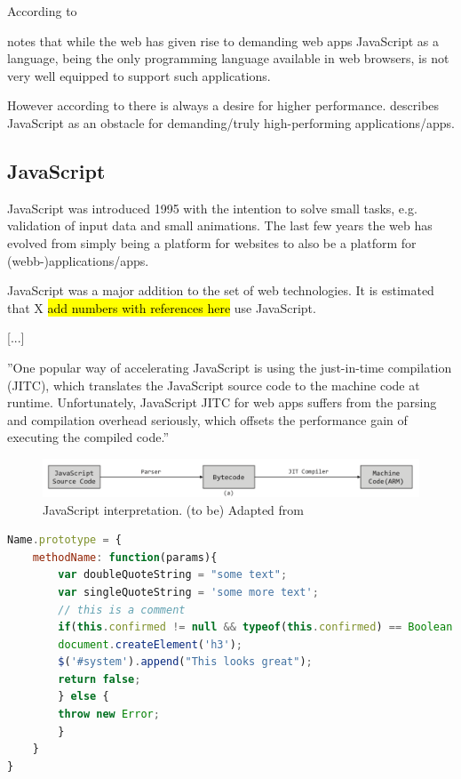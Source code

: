 According to \textcite{ParkJungMoon2015} 



\textcite{HaasRossbergSchuffTitzerHolmanGohmanWagnerZakaiBastien2017} notes that while the web has given rise to demanding web apps JavaScript as a language, being the only programming language available in web browsers, is not very well equipped to support such applications.

However according to \textcite{ReiserBlaser2017} there is always a desire for higher performance. \textcite{Zakai2018} describes JavaScript as an obstacle for demanding/truly high-performing applications/apps.

\subsection{JavaScript}

JavaScript was introduced 1995 with the intention to solve small tasks, e.g. validation of input data and small animations. The last few years the web has evolved from simply being a platform for websites to also be a platform for (webb-)applications/apps.

JavaScript was a major addition to the set of web technologies. It is estimated that X \hl{add numbers with references here} use JavaScript.

[...]



''One popular way of accelerating JavaScript is using the just-in-time compilation (JITC), which translates the JavaScript source code to the machine code at runtime. Unfortunately, JavaScript JITC for web apps suffers from the parsing and compilation overhead seriously, which offsets the performance gain of executing the compiled code.'' \parencite{ParkJungMoon2015}


\begin{figure}[!h]
\centering
\includegraphics[width=16cm,keepaspectratio]{jit-compiling-ParkJungMoon2015}
\caption{JavaScript interpretation. (to be) Adapted from \textcite{ParkJungMoon2015}}
\label{figure:label}
\end{figure}    

\begin{lstlisting}[label=lst1,language=JavaScript,numbers=none,caption=prototype.js,frame=none]
Name.prototype = {
    methodName: function(params){
        var doubleQuoteString = "some text";
        var singleQuoteString = 'some more text';
        // this is a comment
        if(this.confirmed != null && typeof(this.confirmed) == Boolean && this.confirmed == true){
        document.createElement('h3');
        $('#system').append("This looks great");
        return false;
        } else {
        throw new Error;
        }
    }
}
\end{lstlisting}

